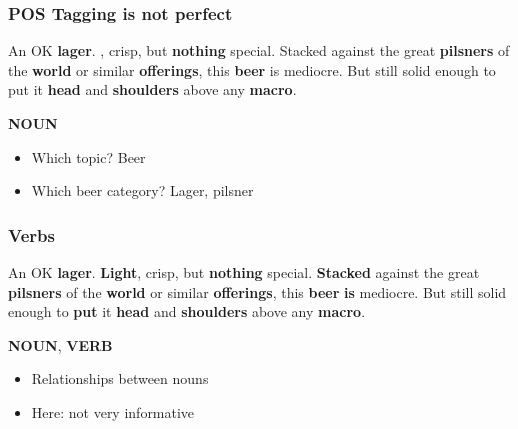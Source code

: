 \begin{frame}
    \frametitle{POS Tagging is not perfect}
\begin{spacing}{1.6}
    An OK \textbf{\textcolor{isered}{lager}}. \textbf{\mybox{\textcolor{isered}{Light}}}, crisp, but \textbf{\textcolor{isered}{nothing}} special. Stacked against the great \textbf{\textcolor{isered}{pilsners}} of the \textbf{\textcolor{isered}{world}} or similar \textbf{\textcolor{isered}{offerings}}, this \textbf{\textcolor{isered}{beer}} is mediocre. But still solid enough to put it \textbf{\textcolor{isered}{head}} and \textbf{\textcolor{isered}{shoulders}} above any \textbf{\textcolor{isered}{macro}}.
\end{spacing}

\vspace{-10pt}
\begin{flushright}
    \textbf{\textcolor{isered}{NOUN}}
\end{flushright}

\vspace{-10pt}
\begin{itemize}
\item Which topic? Beer
\item Which beer category? Lager, pilsner
\end{itemize}

\end{frame}


\begin{frame}
    \frametitle{Verbs}
    \label{review_verbs}
\begin{spacing}{1.6}
    An OK \textbf{\textcolor{isered}{lager}}. \textbf{\textcolor{isered}{Light}}, crisp, but \textbf{\textcolor{isered}{nothing}} special. \textbf{\textcolor{iseblue}{Stacked}} against the great \textbf{\textcolor{isered}{pilsners}} of the \textbf{\textcolor{isered}{world}} or similar \textbf{\textcolor{isered}{offerings}}, this \textbf{\textcolor{isered}{beer}} \textbf{\textcolor{iseblue}{is}} mediocre. But still solid enough to \textbf{\textcolor{iseblue}{put}} it \textbf{\textcolor{isered}{head}} and \textbf{\textcolor{isered}{shoulders}} above any \textbf{\textcolor{isered}{macro}}.
\end{spacing}

\vspace{-10pt}
\begin{flushright}
    \textbf{\textcolor{isered}{NOUN}}, \textbf{\textcolor{iseblue}{VERB}}
\end{flushright}

\begin{itemize}
\item Relationships between nouns $\; \;$\hyperlink{dependency_tree}{}
\item Here: not very informative
\end{itemize}

\end{frame}


